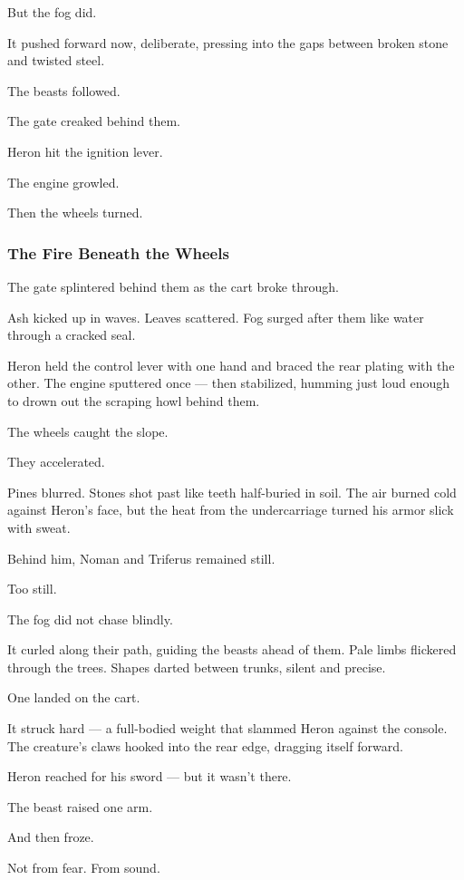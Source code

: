 \documentclass[12pt]{article}
\begin{document}
But the fog did.

It pushed forward now, deliberate, pressing into the gaps between broken stone and twisted steel.

The beasts followed.

The gate creaked behind them.

Heron hit the ignition lever.

The engine growled.

Then the wheels turned.


\dotfill

\subsubsection*{The Fire Beneath the Wheels}

The gate splintered behind them as the cart broke through.

Ash kicked up in waves. Leaves scattered. Fog surged after them like water through a cracked seal.

Heron held the control lever with one hand and braced the rear plating with the other. The engine sputtered once — then stabilized, humming just loud enough to drown out the scraping howl behind them.

The wheels caught the slope.

They accelerated.

Pines blurred. Stones shot past like teeth half-buried in soil. The air burned cold against Heron’s face, but the heat from the undercarriage turned his armor slick with sweat.

Behind him, Noman and Triferus remained still.

Too still.

\bigskip

The fog did not chase blindly.

It curled along their path, guiding the beasts ahead of them. Pale limbs flickered through the trees. Shapes darted between trunks, silent and precise.

One landed on the cart.

It struck hard — a full-bodied weight that slammed Heron against the console. The creature’s claws hooked into the rear edge, dragging itself forward.

Heron reached for his sword — but it wasn’t there.

The beast raised one arm.

And then froze.

Not from fear. From sound.
\end{document}
